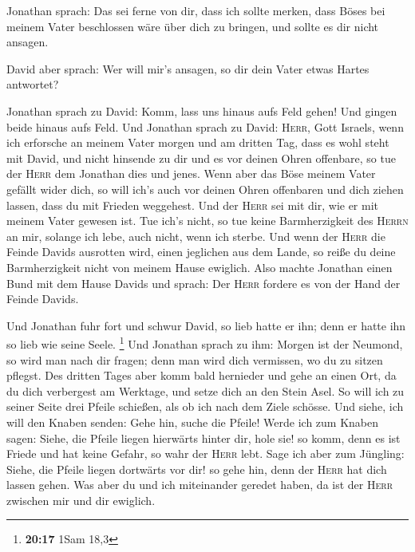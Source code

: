  Jonathan sprach: Das sei ferne von dir, dass ich sollte
merken, dass Böses bei meinem Vater beschlossen wäre über dich zu
bringen, und sollte es dir nicht ansagen.

 David aber sprach: Wer will mir's ansagen, so dir dein
Vater etwas Hartes antwortet?

 Jonathan sprach zu David: Komm, lass uns hinaus aufs
Feld gehen! Und gingen beide hinaus aufs Feld.  Und
Jonathan sprach zu David: \textsc{Herr}, Gott Israels, wenn ich
erforsche an meinem Vater morgen und am dritten Tag, dass es wohl steht
mit David, und nicht hinsende zu dir und es vor deinen Ohren offenbare,
 so tue der \textsc{Herr} dem Jonathan dies und jenes.
Wenn aber das Böse meinem Vater gefällt wider dich, so will ich's auch
vor deinen Ohren offenbaren und dich ziehen lassen, dass du mit Frieden
weggehest. Und der \textsc{Herr} sei mit dir, wie er mit meinem Vater
gewesen ist.  Tue ich's nicht, so tue keine
Barmherzigkeit des \textsc{Herrn} an mir, solange ich lebe, auch nicht,
wenn ich sterbe.  Und wenn der \textsc{Herr} die Feinde
Davids ausrotten wird, einen jeglichen aus dem Lande, so reiße du deine
Barmherzigkeit nicht von meinem Hause ewiglich.  Also
machte Jonathan einen Bund mit dem Hause Davids und sprach: Der
\textsc{Herr} fordere es von der Hand der Feinde Davids.

 Und Jonathan fuhr fort und schwur David, so lieb hatte
er ihn; denn er hatte ihn so lieb wie seine Seele. \footnote{\textbf{20:17}
  1Sam 18,3}  Und Jonathan sprach zu ihm: Morgen ist der
Neumond, so wird man nach dir fragen; denn man wird dich vermissen, wo
du zu sitzen pflegst.  Des dritten Tages aber komm bald
hernieder und gehe an einen Ort, da du dich verbergest am Werktage, und
setze dich an den Stein Asel.  So will ich zu seiner
Seite drei Pfeile schießen, als ob ich nach dem Ziele schösse.
 Und siehe, ich will den Knaben senden: Gehe hin, suche
die Pfeile! Werde ich zum Knaben sagen: Siehe, die Pfeile liegen
hierwärts hinter dir, hole sie! so komm, denn es ist Friede und hat
keine Gefahr, so wahr der \textsc{Herr} lebt.  Sage ich
aber zum Jüngling: Siehe, die Pfeile liegen dortwärts vor dir! so gehe
hin, denn der \textsc{Herr} hat dich lassen gehen.  Was
aber du und ich miteinander geredet haben, da ist der \textsc{Herr}
zwischen mir und dir ewiglich.

